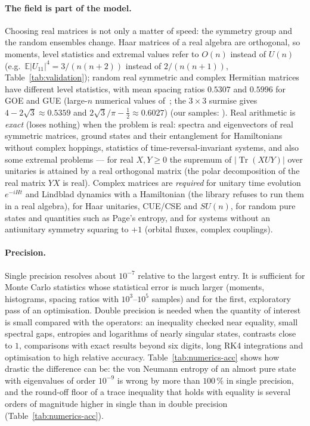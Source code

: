 \documentclass[11pt]{article}
\DeclareMathOperator{\Tr}{Tr}
\begin{document}
\paragraph{The field is part of the model.} Choosing real matrices is not only a matter of speed: the
symmetry group and the random ensembles change. Haar matrices of a real algebra are orthogonal, so
moments, level statistics and extremal values refer to $O(n)$ instead of $U(n)$
(e.g.\ $\mathbb E|U_{11}|^4=3/(n(n+2))$ instead of $2/(n(n+1))$, Table~\ref{tab:validation}); random
real symmetric and complex Hermitian matrices have different level statistics, with mean spacing ratios
$0.5307$ and $0.5996$ for GOE and GUE (large-$n$ numerical values of~\cite[Table~I]{atas2013}; the $3\times3$
surmise gives $4-2\sqrt3\approx0.5359$ and $2\sqrt3/\pi-\frac12\approx0.6027$)
(our samples: ). Real arithmetic is \emph{exact} (loses nothing) when the problem is
real: spectra and eigenvectors of real symmetric matrices, ground states and their entanglement for
Hamiltonians without complex hoppings, statistics of time-reversal-invariant systems, and also some
extremal problems — for real $X,Y\ge0$ the supremum of $|\Tr(XUY)|$ over unitaries is attained by a real
orthogonal matrix (the polar decomposition of the real matrix $YX$ is real). Complex matrices are
\emph{required} for unitary time evolution $e^{-iHt}$ and Lindblad dynamics with a Hamiltonian (the library
refuses to run them in a real algebra), for Haar unitaries, CUE/CSE and $SU(n)$, for random pure states
and quantities such as Page's entropy, and for systems without an antiunitary symmetry squaring to $+1$ (orbital fluxes, complex
couplings).

\paragraph{Precision.} Single precision resolves about $10^{-7}$ relative to the largest entry. It is
sufficient for Monte Carlo statistics whose statistical error is much larger (moments, histograms,
spacing ratios with $10^3$--$10^5$ samples) and for the first, exploratory pass of an optimisation.
Double precision is needed when the quantity of interest is small compared with the operators: an
inequality checked near equality, small spectral gaps, entropies and logarithms of nearly singular
states, contrasts close to $1$, comparisons with exact results beyond six digits, long RK4 integrations
and optimisation to high relative accuracy. Table~\ref{tab:numerics-acc} shows how drastic the
difference can be: the von Neumann entropy of an almost pure state with eigenvalues of order $10^{-9}$ is
wrong by more than $100\,\%$ in single precision, and the round-off floor of a trace inequality that
holds with equality is several orders of magnitude higher in single than in double precision (Table~\ref{tab:numerics-acc}).
\end{document}
